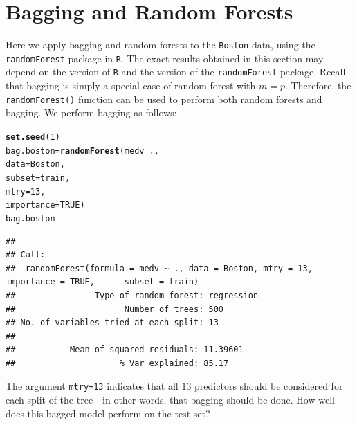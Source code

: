 \documentclass[12pt]{article}\usepackage[]{graphicx}\usepackage[]{color}
\makeatletter
\newcommand{\hlnum}[1]{\textcolor[rgb]{0.686,0.059,0.569}{#1}}%
\newcommand{\hlopt}[1]{\textcolor[rgb]{0,0,0}{#1}}%
\newcommand{\hlstd}[1]{\textcolor[rgb]{0.345,0.345,0.345}{#1}}%
\newcommand{\hlkwb}[1]{\textcolor[rgb]{0.69,0.353,0.396}{#1}}%
\newcommand{\hlkwc}[1]{\textcolor[rgb]{0.333,0.667,0.333}{#1}}%
\newcommand{\hlkwd}[1]{\textcolor[rgb]{0.737,0.353,0.396}{\textbf{#1}}}%
\newenvironment{kframe}{%
 \def\at@end@of@kframe{}%
 \ifinner\ifhmode%
  \def\at@end@of@kframe{\end{minipage}}%
  \begin{minipage}{\columnwidth}%
 \fi\fi%
 \def\FrameCommand##1{\hskip\@totalleftmargin \hskip-\fboxsep
 \colorbox{shadecolor}{##1}\hskip-\fboxsep
     \hskip-\linewidth \hskip-\@totalleftmargin \hskip\columnwidth}%
 \MakeFramed {\advance\hsize-\width
   \@totalleftmargin\z@ \linewidth\hsize
   \@setminipage}}%
 {\par\unskip\endMakeFramed%
 \at@end@of@kframe}
\newenvironment{knitrout}{}{} %
\makeatother
\begin{document}
\newpage
\section{Bagging and Random Forests}

Here we apply bagging and random forests to the \texttt{Boston} data, using the \texttt{randomForest} package in \texttt{R}. The exact results obtained in this section may depend on the version of \texttt{R} and the version of the \texttt{randomForest} package. Recall that bagging is simply a special case of random forest with $m = p$. Therefore, the \texttt{randomForest()} function can be used to perform both random forests and bagging. We perform bagging as follows:

\begin{knitrout}
\color{fgcolor}\begin{kframe}
\begin{alltt}
\hlkwd{set.seed}\hlstd{(}\hlnum{1}\hlstd{)}
\hlstd{bag.boston} \hlkwb{=} \hlkwd{randomForest}\hlstd{(medv}\hlopt{~}\hlstd{.,}
                          \hlkwc{data}\hlstd{=Boston,}
                          \hlkwc{subset}\hlstd{=train,}
                          \hlkwc{mtry}\hlstd{=}\hlnum{13}\hlstd{,}
                          \hlkwc{importance}\hlstd{=}\hlnum{TRUE}\hlstd{)}
\hlstd{bag.boston}
\end{alltt}
\begin{verbatim}
## 
## Call:
##  randomForest(formula = medv ~ ., data = Boston, mtry = 13, importance = TRUE,      subset = train) 
##                Type of random forest: regression
##                      Number of trees: 500
## No. of variables tried at each split: 13
## 
##           Mean of squared residuals: 11.39601
##                     % Var explained: 85.17
\end{verbatim}
\end{kframe}
\end{knitrout}

The argument \texttt{mtry=13} indicates that all $13$ predictors should be considered for each split of the tree - in other words, that bagging should be done. How well does this bagged model perform on the test set?
\end{document}
